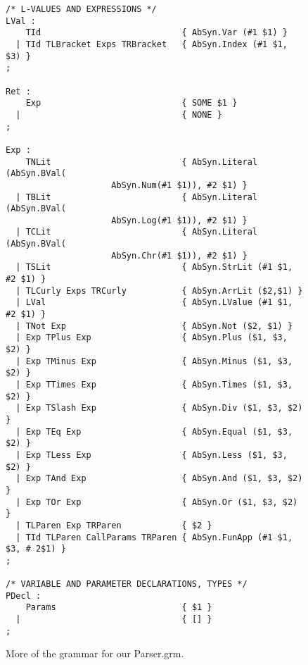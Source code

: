 \documentclass[12pt,a4paper,english]{article}
\begin{document}
\begin{figure}
\begin{lstlisting}
/* L-VALUES AND EXPRESSIONS */
LVal :
    TId                            { AbSyn.Var (#1 $1) }
  | TId TLBracket Exps TRBracket   { AbSyn.Index (#1 $1, $3) }
;

Ret :
    Exp                            { SOME $1 }
  |                                { NONE }
;

Exp :
    TNLit                          { AbSyn.Literal (AbSyn.BVal(
				     AbSyn.Num(#1 $1)), #2 $1) }
  | TBLit                          { AbSyn.Literal (AbSyn.BVal(
				     AbSyn.Log(#1 $1)), #2 $1) }
  | TCLit                          { AbSyn.Literal (AbSyn.BVal(
				     AbSyn.Chr(#1 $1)), #2 $1) } 
  | TSLit                          { AbSyn.StrLit (#1 $1, #2 $1) }
  | TLCurly Exps TRCurly           { AbSyn.ArrLit ($2,$1) }
  | LVal                           { AbSyn.LValue (#1 $1, #2 $1) }
  | TNot Exp                       { AbSyn.Not ($2, $1) }
  | Exp TPlus Exp                  { AbSyn.Plus ($1, $3, $2) }
  | Exp TMinus Exp                 { AbSyn.Minus ($1, $3, $2) }
  | Exp TTimes Exp                 { AbSyn.Times ($1, $3, $2) }
  | Exp TSlash Exp                 { AbSyn.Div ($1, $3, $2) }
  | Exp TEq Exp                    { AbSyn.Equal ($1, $3, $2) }
  | Exp TLess Exp                  { AbSyn.Less ($1, $3, $2) }
  | Exp TAnd Exp                   { AbSyn.And ($1, $3, $2) }
  | Exp TOr Exp                    { AbSyn.Or ($1, $3, $2) }
  | TLParen Exp TRParen            { $2 }
  | TId TLParen CallParams TRParen { AbSyn.FunApp (#1 $1, $3, # 2$1) }
;

/* VARIABLE AND PARAMETER DECLARATIONS, TYPES */
PDecl : 
    Params                         { $1 }
  |                                { [] }
;
\end{lstlisting}
\caption{More of the grammar for our Parser.grm.}\end{figure}
\end{document}
